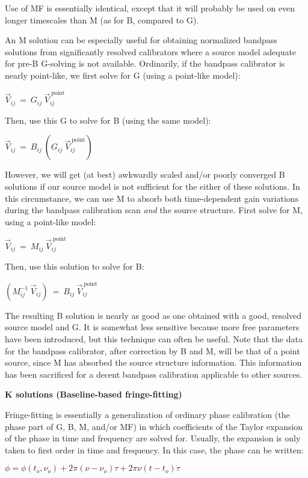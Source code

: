 Use of MF is essentially identical, except that it will probably be
used on even longer timescales than M (as for B, compared to G).

An M solution can be especially useful for obtaining normalized
bandpass solutions from significantly resolved calibrators where a
source model adequate for pre-B G-solving is not available.  Ordinarily,
if the bandpass calibrator is nearly point-like, we first solve for G (using
a point-like model):

$ \vec{V}_{ij}~=~G_{ij}~\vec{V}_{ij}^{\mathrm{~point}} $

Then, use this G to solve for B (using the same model):

$ \vec{V}_{ij}~=~B_{ij}~\left(G_{ij}~\vec{V}_{ij}^{\mathrm{~point}}\right) $

However, we will get (at best) awkwardly scaled and/or poorly
converged B solutions if our source model is not sufficient for the
either of these solutions.  In this circumstance, we can use M to
absorb both time-dependent gain variations during the bandpass
calibration scan {\it and} the source structure.  First solve for M,
using a point-like model:

$ \vec{V}_{ij}~=~M_{ij}~\vec{V}_{ij}^{\mathrm{~point}} $

Then, use this solution to solve for B:

$ \left(M_{ij}^{-1}~\vec{V}_{ij}\right)~=~B_{ij}~\vec{V}_{ij}^{\mathrm{~point}} $

The resulting B solution is nearly as good as one obtained with a
good, resolved source model and G.  It is somewhat less sensitive
because more free parameters have been introduced, but this technique
can often be useful.  Note that the data for the bandpass calibrator,
after correction by B and M, will be that of a point source, since
M has absorbed the source structure information.  This information has
been sacrificed for a decent bandpass calibration applicable to other
sources.

{\bf K solutions (Baseline-based fringe-fitting)}

Fringe-fitting is essentially a generalization of ordinary phase
calibration (the phase part of G, B, M, and/or MF) in which
coefficients of the Taylor expansion of the phase in time and frequency
are solved for.  Usually, the expansion is only taken to first order
in time and frequency.  In this case, the phase can be written:

$ \phi = \phi(t_o,\nu_o) + 2\pi(\nu - \nu_o)\tau + 2\pi\nu(t - t_o)\dot{\tau}$

